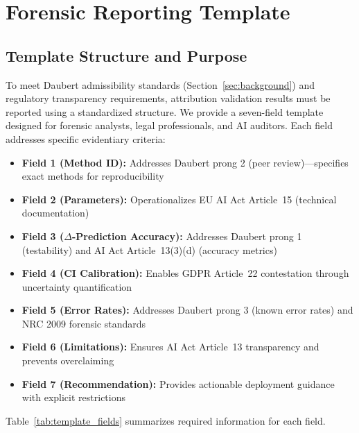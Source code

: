 
\section{Forensic Reporting Template}
\label{sec:template}

\subsection{Template Structure and Purpose}

To meet Daubert admissibility standards (Section~\ref{sec:background}) and regulatory transparency requirements, attribution validation results must be reported using a standardized structure. We provide a seven-field template designed for forensic analysts, legal professionals, and AI auditors. Each field addresses specific evidentiary criteria:

\begin{itemize}
\item \textbf{Field 1 (Method ID):} Addresses Daubert prong 2 (peer review)—specifies exact methods for reproducibility
\item \textbf{Field 2 (Parameters):} Operationalizes EU AI Act Article~15 (technical documentation)
\item \textbf{Field 3 ($\Delta$-Prediction Accuracy):} Addresses Daubert prong 1 (testability) and AI Act Article~13(3)(d) (accuracy metrics)
\item \textbf{Field 4 (CI Calibration):} Enables GDPR Article~22 contestation through uncertainty quantification
\item \textbf{Field 5 (Error Rates):} Addresses Daubert prong 3 (known error rates) and NRC 2009 forensic standards
\item \textbf{Field 6 (Limitations):} Ensures AI Act Article~13 transparency and prevents overclaiming
\item \textbf{Field 7 (Recommendation):} Provides actionable deployment guidance with explicit restrictions
\end{itemize}

Table~\ref{tab:template_fields} summarizes required information for each field.

